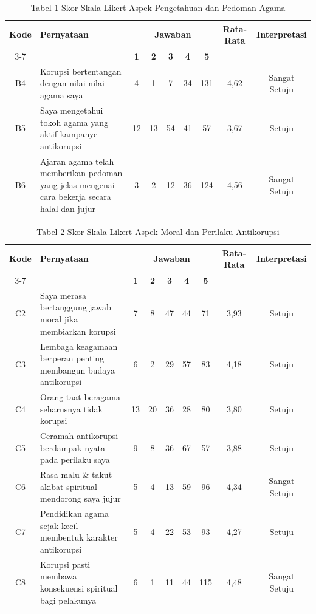 \begin{table}[h]
\centering
\captionsetup{labelformat=empty}
\caption[Skor Skala Likert Aspek Pengetahuan dan Pedoman Agama]{Tabel \ref{tab:TabelhasilkuesionerX1} Skor Skala Likert Aspek Pengetahuan dan Pedoman Agama}
\label{tab:TabelhasilkuesionerX1}
\begin{tabular}{ |c|p{5.5cm}|c|c|c|c|c|c|c| } 
\hline
\multirow{2}{*}{\textbf{Kode}} & \multirow{2}{*}{\textbf{Pernyataan}} & \multicolumn{5}{c|}{\textbf{Jawaban}} & \multirow{2}{*}{\textbf{Rata-Rata}} & \multirow{2}{*}{\textbf{Interpretasi}} \\
\cline{3-7}
& & \textbf{1} & \textbf{2} & \textbf{3} & \textbf{4} & \textbf{5} & & \\
\hline
B4 & Korupsi bertentangan dengan nilai-nilai agama saya & 4 & 1 & 7 & 34 & 131 & 4,62 & Sangat Setuju \\
\hline
B5 & Saya mengetahui tokoh agama yang aktif kampanye antikorupsi & 12 & 13 & 54 & 41 & 57 & 3,67 & Setuju \\
\hline
B6 & Ajaran agama telah memberikan pedoman yang jelas mengenai cara bekerja secara halal dan jujur & 3 & 2 & 12 & 36 & 124 & 4,56 & Sangat Setuju \\
\hline
\end{tabular}
\end{table}

\begin{table}[h]
\centering
\captionsetup{labelformat=empty}
\caption[Skor Skala Likert Aspek Moral dan Perilaku Antikorupsi]{Tabel \ref{tab:TabelhasilkuesionerX2} Skor Skala Likert Aspek Moral dan Perilaku Antikorupsi}
\label{tab:TabelhasilkuesionerX2}
\begin{tabular}{ |c|p{5.5cm}|c|c|c|c|c|c|c| } 
\hline
\multirow{2}{*}{\textbf{Kode}} & \multirow{2}{*}{\textbf{Pernyataan}} & \multicolumn{5}{c|}{\textbf{Jawaban}} & \multirow{2}{*}{\textbf{Rata-Rata}} & \multirow{2}{*}{\textbf{Interpretasi}} \\
\cline{3-7}
& & \textbf{1} & \textbf{2} & \textbf{3} & \textbf{4} & \textbf{5} & & \\
\hline
C2 & Saya merasa bertanggung jawab moral jika membiarkan korupsi & 7 & 8 & 47 & 44 & 71 & 3,93 & Setuju \\
\hline
C3 & Lembaga keagamaan berperan penting membangun budaya antikorupsi & 6 & 2 & 29 & 57 & 83 & 4,18 & Setuju \\
\hline
C4 & Orang taat beragama seharusnya tidak korupsi & 13 & 20 & 36 & 28 & 80 & 3,80 & Setuju \\
\hline
C5 & Ceramah antikorupsi berdampak nyata pada perilaku saya & 9 & 8 & 36 & 67 & 57 & 3,88 & Setuju \\
\hline
C6 & Rasa malu \& takut akibat spiritual mendorong saya jujur & 5 & 4 & 13 & 59 & 96 & 4,34 & Sangat Setuju \\
\hline
C7 & Pendidikan agama sejak kecil membentuk karakter antikorupsi & 5 & 4 & 22 & 53 & 93 & 4,27 & Setuju \\
\hline
C8 & Korupsi pasti membawa konsekuensi spiritual bagi pelakunya & 6 & 1 & 11 & 44 & 115 & 4,48 & Sangat Setuju \\
\hline
\end{tabular}
\end{table}
